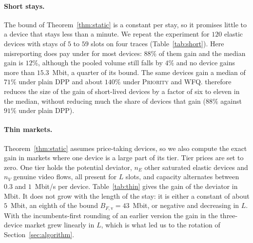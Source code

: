 \paragraph{Short stays.}
The bound of Theorem~\ref{thm:static} is a constant per stay, so it promises little to a device that stays less than a minute.
We repeat the experiment for $120$ elastic devices with stays of $5$ to $59$ slots on four traces (Table~\ref{tab:short}).
Here misreporting does pay under \repay{} for most devices: $88\%$ of them gain and the median gain is $12\%$, although the pooled volume still falls by $4\%$ and no device gains more than $15.3$~Mbit, a quarter of its bound.
The same devices gain a median of $71\%$ under plain DPP and about $140\%$ under \textsc{Priority} and \textsc{WFQ}.
\repay{} therefore reduces the size of the gain of short-lived devices by a factor of six to eleven in the median, without reducing much the share of devices that gain ($88\%$ against $91\%$ under plain DPP).

\begin{table}[t]
\centering
\caption{Unilateral misreport by devices that stay $5$ to $59$ slots ($120$ devices on four traces).}
\label{tab:short}
\resizebox{\linewidth}{!}{}
\end{table}

\paragraph{Thin markets.}
Theorem~\ref{thm:static} assumes price-taking devices, so we also compute the exact gain in markets where one device is a large part of its tier.
Tier prices are set to zero. One tier holds the potential deviator, $n_E$ other saturated elastic devices and $n_V$ genuine video flows, all present for $L$ slots, and capacity alternates between $0.3$ and $1$~Mbit/s per device.
Table~\ref{tab:thin} gives the gain of the deviator in Mbit.
It does not grow with the length of the stay: it is either a constant of about $5$~Mbit, an eighth of the bound $B_{F,\mathrm{v}}=43$~Mbit, or negative and decreasing in $L$.
With the incumbents-first rounding of an earlier version the gain in the three-device market grew linearly in $L$, which is what led us to the rotation of Section~\ref{sec:algorithm}.

\begin{table}[t]
\centering
\caption{Exact gain of one elastic device that declares video for its whole stay ($180$ devices on six traces). Relative gains are with respect to the volume under truthful declaration; brackets are 95\% bootstrap intervals over traces.}
\label{tab:deviation}
\resizebox{\linewidth}{!}{}
\end{table}

